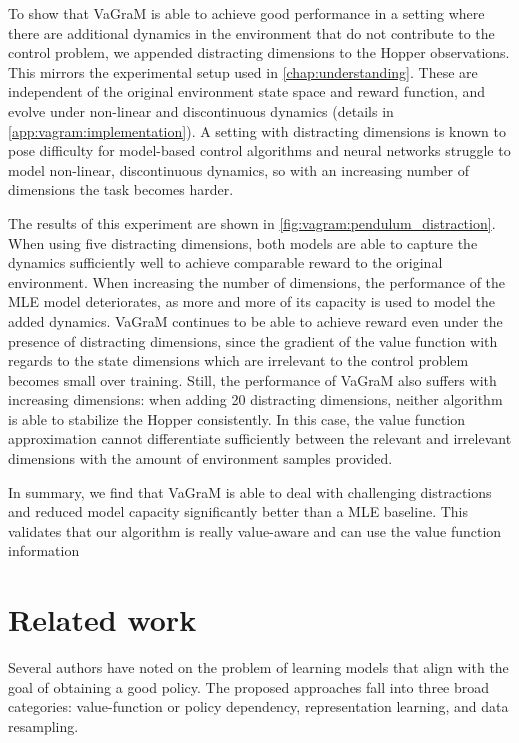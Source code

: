 To show that VaGraM is able to achieve good performance in a setting where there are additional dynamics in the environment that do not contribute to the control problem, we appended distracting dimensions to the Hopper observations.
This mirrors the experimental setup used in \autoref{chap:understanding}.
These are independent of the original environment state space and reward function, and evolve under non-linear and discontinuous dynamics (details in \autoref{app:vagram:implementation}).
A setting with distracting dimensions is known to pose difficulty for model-based control algorithms \parencite{stone2021thedc} and neural networks struggle to model non-linear, discontinuous dynamics, so with an increasing number of dimensions the task becomes harder.

The results of this experiment are shown in \autoref{fig:vagram:pendulum_distraction}.
When using five distracting dimensions, both models are able to capture the dynamics sufficiently well to achieve comparable reward to the original environment.
When increasing the number of dimensions, the performance of the MLE model deteriorates, as more and more of its capacity is used to model the added dynamics.
VaGraM continues to be able to achieve reward even under the presence of distracting dimensions, since the gradient of the value function with regards to the state dimensions which are irrelevant to the control problem becomes small over training.
Still, the performance of VaGraM also suffers with increasing dimensions: when adding 20 distracting dimensions, neither algorithm is able to stabilize the Hopper consistently.
In this case, the value function approximation cannot differentiate sufficiently between the relevant and irrelevant dimensions with the amount of environment samples provided.

In summary, we find that VaGraM is able to deal with challenging distractions and reduced model capacity significantly better than a MLE baseline. This validates that our algorithm is really value-aware and can use the value function information 

\section{Related work}

Several authors have noted on the problem of learning models that align with the goal of obtaining a good policy. The proposed approaches fall into three broad categories: value-function or policy dependency, representation learning, and data resampling.


